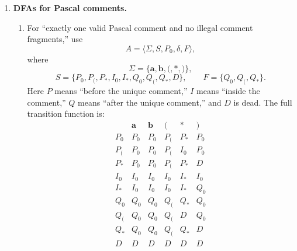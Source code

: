 \documentclass[11pt,openany]{book}
\begin{document}
\begin{enumerate}[{1.}1.]
\begin{enumerate}
\item The quintuple is
\[
\langle\{\pmb{a},\pmb{b},\pmb{c}\},\{r_0,r_1,r_2\},r_0,\delta,\{r_0\}\rangle,
\]
where
\[
\delta(r_0,\pmb{a})=r_1,\quad \delta(r_0,\pmb{b})=r_0,\quad \delta(r_0,\pmb{c})=r_0,
\]
\[
\delta(r_1,\pmb{a})=r_2,\quad \delta(r_1,\pmb{b})=r_1,\quad \delta(r_1,\pmb{c})=r_1,
\]
\[
\delta(r_2,\pmb{a})=r_0,\quad \delta(r_2,\pmb{b})=r_2,\quad \delta(r_2,\pmb{c})=r_2.
\]
\end{enumerate}

\item \textbf{DFAs for Pascal comments.}

\begin{enumerate}
\item For ``exactly one valid Pascal comment and no illegal comment fragments,'' use
\[
A=\langle\Sigma,S,P_0,\delta,F\rangle,
\]
where
\[
\Sigma=\{\pmb{a},\pmb{b},\pmb{(},\pmb{*},\pmb{)}\},
\]
\[
S=\{P_0,P_{(},P_{*},I_0,I_{*},Q_0,Q_{(},Q_{*},D\},
\qquad
F=\{Q_0,Q_{(},Q_{*}\}.
\]
Here $P$ means ``before the unique comment,'' $I$ means ``inside the comment,''
$Q$ means ``after the unique comment,'' and $D$ is dead. The full transition
function is:
\[
\begin{array}{c|ccccc}
      & \pmb{a} & \pmb{b} & \pmb{(} & \pmb{*} & \pmb{)} \\\hline
P_0   & P_0 & P_0 & P_{(} & P_{*} & P_0 \\
P_{(} & P_0 & P_0 & P_{(} & I_0   & P_0 \\
P_{*} & P_0 & P_0 & P_{(} & P_{*} & D   \\
I_0   & I_0 & I_0 & I_0   & I_{*} & I_0 \\
I_{*} & I_0 & I_0 & I_0   & I_{*} & Q_0 \\
Q_0   & Q_0 & Q_0 & Q_{(} & Q_{*} & Q_0 \\
Q_{(} & Q_0 & Q_0 & Q_{(} & D     & Q_0 \\
Q_{*} & Q_0 & Q_0 & Q_{(} & Q_{*} & D   \\
D     & D   & D   & D     & D     & D
\end{array}
\]


\end{enumerate}
\end{enumerate}
\end{document}
